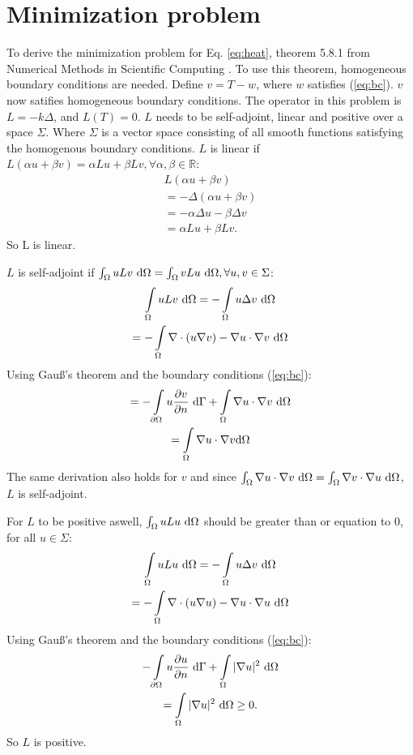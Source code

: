 \section{Minimization problem}
To derive the minimization problem for Eq. \ref{eq:heat}, theorem 5.8.1 from Numerical Methods in Scientific Computing \cite{kan}. To use this theorem, homogeneous boundary conditions are needed. Define $v=T-w$, where $w$ satisfies (\ref{eq:bc}). $v$ now satifies homogeneous boundary conditions. The operator in this problem is $L=-k\Delta$, and $L(T)=0$. $L$ needs to be self-adjoint, linear and positive over a space $\Sigma$. Where $\Sigma$ is a vector space consisting of all smooth functions satisfying the homogenous boundary conditions. $L$ is linear if $L(\alpha u+\beta v)=\alpha Lu+\beta Lv, \forall\alpha,\beta\in\mathbb{R}$:
\begin{gather*}
    L(\alpha u+\beta v)\\
    =-\Delta(\alpha u + \beta v)\\
    =-\alpha\Delta u-\beta \Delta v\\
    = \alpha Lu+\beta Lv.
\end{gather*}So L is linear.

$L$ is self-adjoint if $\int\displaylimits_\Omega uLv~\text{d}\Omega=\int\displaylimits_\Omega vLu~\text{d}\Omega, \forall u,v\in \Sigma$:
\begin{gather*}
    \int\displaylimits_\Omega uLv~\text{d}\Omega = -\int\displaylimits_\Omega u\Delta v~\text{d}\Omega\\
    =-\int\displaylimits_\Omega \nabla \cdot (u\nabla v) - \nabla u\cdot\nabla v~\text{d}\Omega
\end{gather*}
Using Gau\ss's theorem and the boundary conditions (\ref{eq:bc}):
\begin{gather*}
    =-\int\displaylimits_{\partial\Omega} u\frac{\partial v}{\partial n}~\text{d}\Gamma + \int\displaylimits_\Omega \nabla u\cdot\nabla v~\text{d}\Omega\\
    =\int\displaylimits_\Omega \nabla u\cdot \nabla v\text{d}\Omega
\end{gather*}
The same derivation also holds for $v$ and since $\int\displaylimits_\Omega \nabla u\cdot \nabla v~\text{d}\Omega = \int\displaylimits_\Omega \nabla v\cdot \nabla u~\text{d}\Omega$, $L$ is self-adjoint.

For $L$ to be positive aswell, $\int\displaylimits_\Omega uLu~\text{d}\Omega$ should be greater than or equation to 0, for all $u\in \Sigma$:
\begin{gather*}
    \int\displaylimits_\Omega uLu~\text{d}\Omega = - \int\displaylimits_\Omega u\Delta v~\text{d}\Omega\\
    = -\int\displaylimits_\Omega \nabla \cdot(u\nabla u) - \nabla u\cdot\nabla u~\text{d}\Omega
\end{gather*} Using Gau\ss's theorem and the boundary conditions (\ref{eq:bc}):
\begin{gather*}
    -\int\displaylimits_{\partial\Omega} u\frac{\partial u}{\partial n}~\text{d}\Gamma + \int\displaylimits_{\Omega} |\nabla u|^2~\text{d}\Omega \\
    =\int\displaylimits_\Omega |\nabla u|^2~\text{d}\Omega \geq 0.
\end{gather*} So $L$ is positive.


